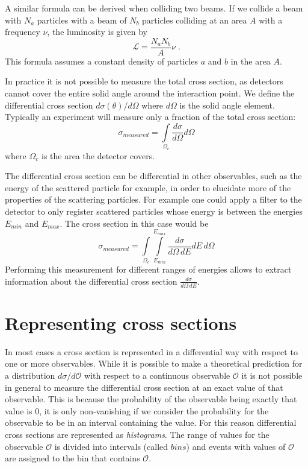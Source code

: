 \documentclass[12pt]{article}
\begin{document}
A similar formula can be derived when colliding two beams. If we collide a beam with $N_a$ particles with a beam of $N_b$ particles colliding at an area $A$ with a frequency $\nu$, the luminosity is given by
\[\mathcal{L}=\frac{N_aN_b}{A}\nu\;.\]
This formula assumes a constant density of particles $a$ and $b$ in the area $A$.

In practice it is not possible to measure the total cross section, as detectors cannot cover the entire solid angle around the interaction point. We define the differential cross section $d\sigma(\theta)/d\Omega$ where $d\Omega$ is the solid angle element. Typically an experiment will measure only a fraction of the total cross section:
\[\sigma_{measured}=\int\limits_{\Omega_c}\frac{d\sigma}{d\Omega}d\Omega\]
  where $\Omega_c$ is the area the detector covers.

  The differential cross section can be differential in other observables, such as the energy of the scattered particle for example, in order to elucidate more of the properties of the scattering particles. For example one could apply a filter to the detector to only register scattered particles whose energy is between the energies $E_{min}$ and $E_{max}$. The cross section in this case would be
  \[\sigma_{measured}=\int\limits_{\Omega_c}\int\limits_{E_{min}}^{E_{max}}\frac{d\sigma}{d\Omega\,dE}dE \,d\Omega\]
Performing this measurement for different ranges of energies allows to extract information about the differential cross section $\frac{d\sigma}{d\Omega\,dE}$.
%
\section{Representing cross sections}
%
%
In most cases a cross section is represented in a differential way with respect to one or more observables. While it is possible to make a theoretical prediction for a distribution $d\sigma/d\mathcal{O}$ with respect to a continuous observable $\mathcal{O}$ it is not possible in general to measure the differential cross section at an exact value of that observable. This is because the probability of the observable being exactly that value is $0$, it is only non-vanishing if we consider the probability for the observable to be in an interval containing the value. For this reason differential cross sections are represented as \emph{histograms}. The range of values for the observable $\mathcal{O}$ is divided into intervals (called $bins$) and events with values of $\mathcal{O}$ are assigned to the bin that contains $\mathcal{O}$. 
\end{document}
